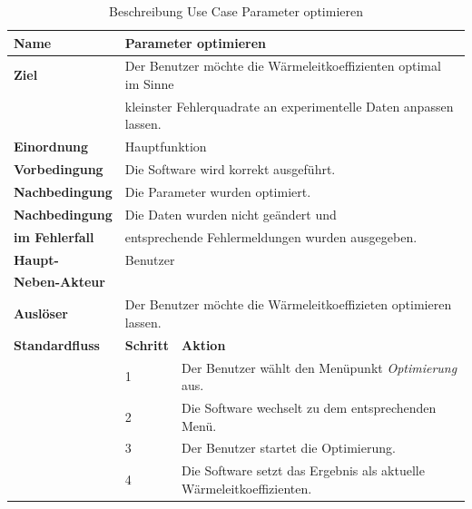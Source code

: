 \begin{table} [H]
	\centering
	\begin{tabular}{|l|l|l|}
		\hline
		\textbf{Name} 			& \multicolumn{2}{|l|}{Parameter optimieren}  \\
		\hline
		\textbf{Ziel} 			& \multicolumn{2}{|l|}{Der Benutzer möchte die Wärmeleitkoeffizienten optimal im Sinne}\\
								& \multicolumn{2}{|l|}{kleinster Fehlerquadrate an experimentelle Daten anpassen lassen.}\\
		\hline
		\textbf{Einordnung}		& \multicolumn{2}{|l|}{Hauptfunktion}\\
		\hline
		\textbf{Vorbedingung}	& \multicolumn{2}{|l|}{Die Software wird korrekt ausgeführt.} \\
		\hline
		\textbf{Nachbedingung}	& \multicolumn{2}{|l|}{Die Parameter wurden optimiert.}\\
		\hline
		\textbf{Nachbedingung} 	& \multicolumn{2}{|l|}{Die Daten wurden nicht geändert und}\\
		\textbf{im Fehlerfall}	& \multicolumn{2}{|l|}{entsprechende Fehlermeldungen wurden ausgegeben.}\\
		\hline
		\textbf{Haupt-} 		& \multicolumn{2}{|l|}{Benutzer}\\
		\textbf{Neben-Akteur}	& \multicolumn{2}{|l|}{	}			\\
		\hline
		\textbf{Auslöser} 		& \multicolumn{2}{|l|}{Der Benutzer möchte die Wärmeleitkoeffizieten optimieren lassen.} \\
		\hline 
		\textbf{Standardfluss} & \textbf{Schritt} & \textbf{Aktion} \\
		\hline
		&	1	& Der Benutzer wählt den Menüpunkt \emph{Optimierung} aus. \\
		\cline{2-3}
		&	2	& Die Software wechselt zu dem entsprechenden Menü.\\
		\cline{2-3}
		&	3	& Der Benutzer startet die Optimierung.\\
		\cline{2-3}
		&	4	& Die Software setzt das Ergebnis als aktuelle Wärmeleitkoeffizienten.\\
		\hline
	\end{tabular}
	\caption{Beschreibung Use Case Parameter optimieren}
	\label{Beschreibung Use Case Parameter optimieren}
\end{table}

